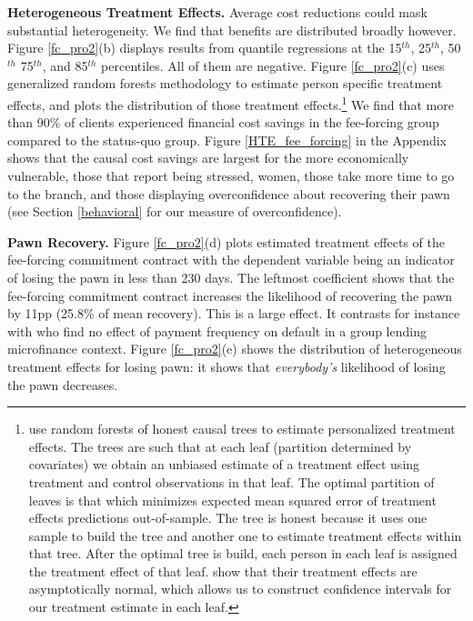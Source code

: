\documentclass[11pt]{article}
\begin{document}
\vspace{.2in}
\noindent \textbf{Heterogeneous Treatment Effects.} Average cost reductions could mask substantial heterogeneity. We find that benefits are distributed broadly however. Figure \ref{fc_pro2}(b) displays results from quantile regressions at the 15$^{th}$, 25$^{th}$, 50$^{th}$ 75$^{th}$, and 85$^{th}$ percentiles. All of them are negative. Figure \ref{fc_pro2}(c) uses \cite{atheygrf} generalized random forests methodology to estimate person specific treatment effects, and plots the distribution of those treatment effects.\footnote{\cite{atheygrf} use random forests of honest causal trees to estimate personalized treatment effects. The trees are such that at each leaf (partition determined by covariates) we obtain an unbiased estimate of a treatment effect using treatment and control observations in that leaf. The optimal partition of leaves is that which minimizes expected mean squared error of treatment effects predictions out-of-sample. The tree is honest because it uses one sample to build the tree and another one to estimate treatment effects within that tree. After the optimal tree is build, each person in each leaf is assigned the treatment effect of that leaf. \cite{atheygrf} show that their treatment effects are asymptotically normal, which allows us to construct confidence intervals for our treatment estimate in each leaf. } We find that more than 90\% of clients experienced financial cost savings in the fee-forcing group compared to the status-quo group. Figure \ref{HTE_fee_forcing} in the Appendix shows that the causal cost savings are largest for the more economically vulnerable, %
those that report being stressed, women, those take more time to go to the branch, and those displaying overconfidence about recovering their pawn (see Section \ref{behavioral} for our measure of overconfidence).

\vspace{.2in}
\noindent \textbf{Pawn Recovery.} Figure \ref{fc_pro2}(d) plots estimated treatment effects of the fee-forcing commitment contract with the dependent variable being an indicator of losing the pawn in less than 230 days. The leftmost coefficient shows that the fee-forcing commitment contract increases the likelihood of recovering the pawn by 11pp (25.8\% of mean recovery). This is a large effect. It contrasts for instance with \cite{Pande} who find no effect of payment frequency on default in a group lending microfinance context. Figure \ref{fc_pro2}(e) shows the distribution of heterogeneous treatment effects for losing pawn: it shows that \textit{everybody's} likelihood of losing the pawn decreases. %
\end{document}
